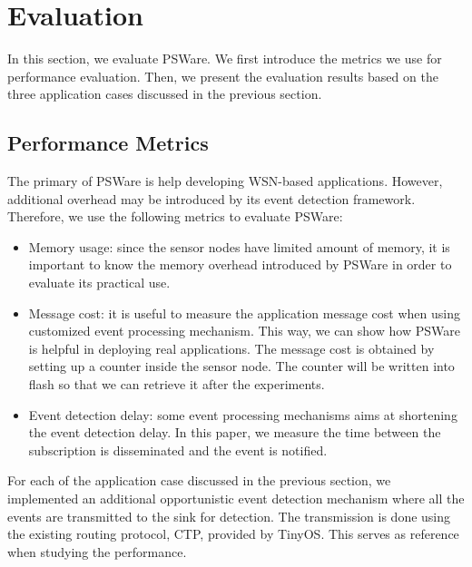 \section{Evaluation}
\label{sec:experiments}
In this section, we evaluate PSWare. We first introduce the metrics we use for performance evaluation. Then, we present the evaluation results based on the three application cases discussed in the previous section. 

\subsection{Performance Metrics}
The primary of PSWare is help developing WSN-based applications. However, additional overhead may be introduced by its event detection framework. Therefore, we use the following metrics to evaluate PSWare:
\begin{itemize}
\item Memory usage: since the sensor nodes have limited amount of memory, it is important to know the memory overhead introduced by PSWare in order to evaluate its practical use. 
\item Message cost: it is useful to measure the application message cost when using customized event processing mechanism. This way, we can show how PSWare is helpful in deploying real applications. The message cost is obtained by setting up a counter inside the sensor node. The counter will be written into flash so that we can retrieve it after the experiments.
\item Event detection delay: some event processing mechanisms aims at shortening the event detection delay. In this paper, we measure the time between the subscription is disseminated and the event is notified.
\end{itemize}

For each of the application case discussed in the previous section, we implemented an additional opportunistic event detection mechanism where all the events are transmitted to the sink for detection. The transmission is done using the existing routing protocol, CTP, provided by TinyOS. This serves as reference when studying the performance.

